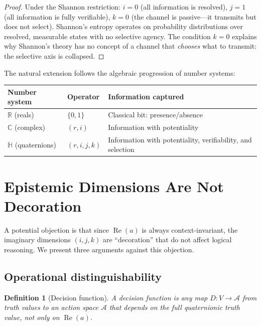 \documentclass[11pt,a4paper]{article}
\newtheorem{definition}[theorem]{Definition}
\newcommand{\rey}[1]{{\color{rcolor}#1}}
\newcommand{\imag}[1]{{\color{icolor}#1}}
\newcommand{\exac}[1]{{\color{jcolor}#1}}
\newcommand{\recu}[1]{{\color{kcolor}#1}}
\newcommand{\Real}{\operatorname{Re}}
\def\rey#1{#1}%
\def\imag#1{#1}%
\def\exac#1{#1}%
\def\recu#1{#1}%
\begin{document}
\begin{proof}
Under the Shannon restriction: $\imag{i} = 0$ (all information is
resolved), $\exac{j} = 1$ (all information is fully verifiable),
$\recu{k} = 0$ (the channel is passive---it transmits but does not
select). Shannon's entropy operates on probability distributions over
resolved, measurable states with no selective agency. The condition
$k = 0$ explains why Shannon's theory has no concept of a channel that
\emph{chooses} what to transmit: the selective axis is collapsed.
\end{proof}

The natural extension follows the algebraic progression of number
systems:
\begin{center}
\renewcommand{\arraystretch}{1.3}
\begin{tabular}{@{}lll@{}}
\toprule
\textbf{Number system} & \textbf{Operator} &
\textbf{Information captured} \\
\midrule
$\mathbb{R}$ (reals)        & $\{0, 1\}$
  & Classical bit: presence/absence \\
$\mathbb{C}$ (complex)      & $(\rey{r}, \imag{i})$
  & Information with potentiality \\
$\mathbb{H}$ (quaternions)  & $(\rey{r}, \imag{i}, \exac{j}, \recu{k})$
  & Information with potentiality, verifiability, and selection \\
\bottomrule
\end{tabular}
\end{center}

\section{Epistemic Dimensions Are Not Decoration}
\label{sec:decoration}

A potential objection is that since $\Real(a)$ is always
context-invariant, the imaginary dimensions
$(\imag{i},\exac{j},\recu{k})$ are ``decoration'' that do not
affect logical reasoning. We present three arguments against this
objection.

\subsection{Operational distinguishability}

\begin{definition}[Decision function]
\label{def:decision}
A \emph{decision function} is any map $D:V\to\mathcal{A}$ from
truth values to an action space $\mathcal{A}$ that depends on the
full quaternionic truth value, not only on $\Real(a)$.
\end{definition}
\end{document}
